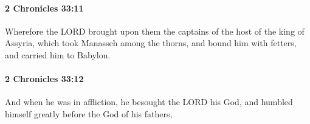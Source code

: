 		\paragraph{2 Chronicles 33:11} %
			\label{2CHRONICLES-33-11}

			Wherefore the LORD brought upon them the captains of the host of the king of Assyria, which took Manasseh among the thorns, and bound him with fetters, and carried him to Babylon.


		\paragraph{2 Chronicles 33:12} %
			\label{2CHRONICLES-33-12}

			And when he was in affliction, he besought the LORD his God, and humbled himself greatly before the God of his fathers,


